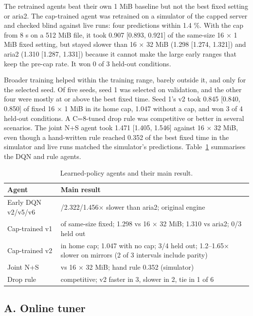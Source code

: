 \documentclass[conference]{IEEEtran}
\begin{document}
The retrained agents beat their own 1 MiB baseline but not the best fixed setting or aria2. The cap-trained agent was retrained on a simulator of the capped server and checked blind against live runs: four predictions within 1.4 \%. With the cap from 8 s on a 512 MiB file, it took 0.907 [0.893, 0.921] of the same-size 16 × 1 MiB fixed setting, but stayed slower than 16 × 32 MiB (1.298 [1.274, 1.321]) and aria2 (1.310 [1.287, 1.331]) because it cannot make the large early ranges that keep the pre-cap rate. It won 0 of 3 held-out conditions.


Broader training helped within the training range, barely outside it, and only for the selected seed. Of five seeds, seed 1 was selected on validation, and the other four were mostly at or above the best fixed time. Seed 1's v2 took 0.845 [0.840, 0.850] of fixed 16 × 1 MiB in its home cap, 1.047 without a cap, and won 3 of 4 held-out conditions. A C=8-tuned drop rule was competitive or better in several scenarios. The joint N+S agent took 1.471 [1.405, 1.546] against 16 × 32 MiB, even though a hand-written rule reached 0.352 of the best fixed time in the simulator and live runs matched the simulator's predictions. Table~\ref{tab:agents} summarises the DQN and rule agents.



\begin{table}[!t]\centering\footnotesize
\caption{Learned-policy agents and their main result.}
\label{tab:agents}
\begin{tabularx}{\columnwidth}{@{}>{\hsize=0.8\hsize\raggedright\arraybackslash}X>{\hsize=1.2\hsize\raggedright\arraybackslash}X@{}}
\toprule
\textbf{Agent} & \textbf{Main result}\\
\midrule
Early DQN v2/v5/v6 & 1.757/2.322/1.456× slower than aria2; original engine\\
Cap-trained v1 & 0.907 of same-size fixed; 1.298 vs 16 × 32 MiB; 1.310 vs aria2; 0/3 held out\\
Cap-trained v2 & 0.845 in home cap; 1.047 with no cap; 3/4 held out; 1.2–1.65× slower on mirrors (2 of 3 intervals include parity)\\
Joint N+S & 1.471 vs 16 × 32 MiB; hand rule 0.352 (simulator)\\
Drop rule & competitive; v2 faster in 3, slower in 2, tie in 1 of 6\\
\bottomrule
\end{tabularx}
\end{table}


\subsection*{A. Online tuner}
\end{document}
